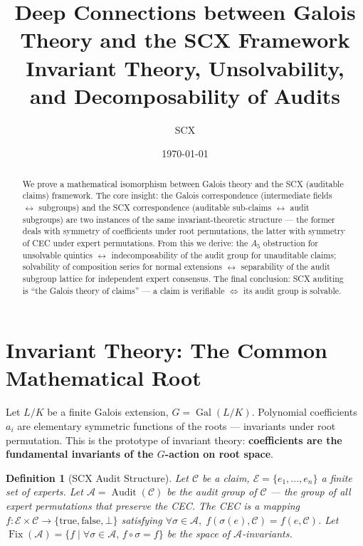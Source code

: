 \documentclass[10pt,a4paper]{article}
\title{\bfseries Deep Connections between Galois Theory and the SCX Framework\\[1pt]
\normalsize Invariant Theory, Unsolvability, and Decomposability of Audits}
\author{SCX}
\date{\today}
\newtheorem{definition}[theorem]{Definition}
\theoremstyle{remark}
\DeclareMathOperator{\Gal}{Gal}
\DeclareMathOperator{\Audit}{Audit}
\DeclareMathOperator{\Fix}{Fix}
\newcommand{\A}{\mathcal{A}}
\newcommand{\E}{\mathcal{E}}
\newcommand{\cC}{\mathcal{C}}
\begin{document}
\maketitle
\vspace{-8pt}

\begin{abstract}
\small We prove a mathematical isomorphism between Galois theory and the SCX (auditable claims) framework. The core insight: the Galois correspondence (intermediate fields $\leftrightarrow$ subgroups) and the SCX correspondence (auditable sub-claims $\leftrightarrow$ audit subgroups) are two instances of the same invariant-theoretic structure — the former deals with symmetry of coefficients under root permutations, the latter with symmetry of CEC under expert permutations. From this we derive: the $A_5$ obstruction for unsolvable quintics $\leftrightarrow$ indecomposability of the audit group for unauditable claims; solvability of composition series for normal extensions $\leftrightarrow$ separability of the audit subgroup lattice for independent expert consensus. The final conclusion: SCX auditing is ``the Galois theory of claims'' — a claim is verifiable $\iff$ its audit group is solvable.
\end{abstract}
\vspace{-4pt}

\section{Invariant Theory: The Common Mathematical Root}

Let $L/K$ be a finite Galois extension, $G = \Gal(L/K)$. Polynomial coefficients $a_i$ are elementary symmetric functions of the roots — invariants under root permutation. This is the prototype of invariant theory: \textbf{coefficients are the fundamental invariants of the $G$-action on root space}.

\begin{definition}[SCX Audit Structure]
Let $\cC$ be a claim, $\E=\{e_1,\ldots,e_n\}$ a finite set of experts. Let $\A=\Audit(\cC)$ be the audit group of $\cC$ — the group of all expert permutations that preserve the CEC. The CEC is a mapping $f: \E \times \cC \to \{\text{true},\text{false},\bot\}$ satisfying $\forall\sigma\in\A,\; f(\sigma(e),\cC)=f(e,\cC)$. Let $\Fix(\A)=\{f\mid\forall\sigma\in\A,\,f\circ\sigma=f\}$ be the space of $\A$-invariants.
\end{definition}
\end{document}
